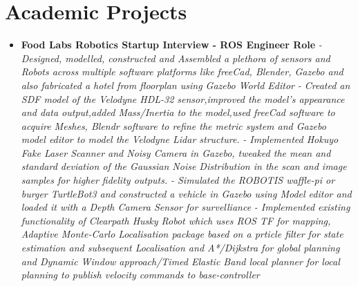 \documentclass[a4paper,12pt]{article}
\begin{document}
\section*{Academic Projects}
\begin{itemize}
    \item{\textbf{\large{Food Labs Robotics Startup Interview - ROS Engineer Role}}
    \newline
    \textit{- Designed, modelled, constructed and
    Assembled a plethora of sensors and Robots across multiple software platforms like
    freeCad, Blender, Gazebo and also fabricated a hotel from floorplan using Gazebo World Editor}
    \newline
    \textit{- Created an SDF model of the Velodyne HDL-32 sensor,improved the model's appearance and data output,added Mass/Inertia to the model,used freeCad software to acquire Meshes, Blendr software to refine the metric system and Gazebo model editor to model the Velodyne Lidar structure.}
    \newline
    \textit{- Implemented Hokuyo Fake Laser Scanner and Noisy Camera in Gazebo, tweaked the mean and standard deviation of the Gaussian Noise Distribution in the scan and image samples for higher fidelity outputs.}
    \newline
    \textit{- Simulated the ROBOTIS waffle-pi or burger TurtleBot3 and constructed a vehicle in Gazebo using Model editor and loaded it with a Depth Camera Sensor for survelliance}
    \newline
    \textit{- Implemented existing functionality of Clearpath Husky Robot which uses ROS TF for mapping, Adaptive Monte-Carlo Localisation package based on a prticle filter for state estimation and subsequent Localisation and A*/Dijkstra for global planning and Dynamic Window approach/Timed Elastic Band local planner for local planning to publish velocity commands to base-controller}}
    \newline


\end{itemize}
\end{document}
